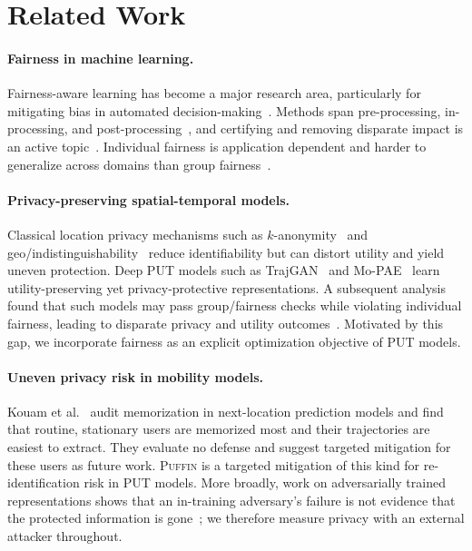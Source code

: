 \documentclass[sigconf,anonymous,review]{acmart}
\newcommand{\puffin}{\textsc{Puffin}}
\begin{document}
\section{Related Work}
\paragraph{Fairness in machine learning.} Fairness-aware learning has become a major research area, particularly for mitigating bias in automated decision-making~\cite{barocas2016disparate}. Methods span pre-processing, in-processing, and post-processing~\cite{hardt2016equality,mehrabi2021survey}, and certifying and removing disparate impact is an active topic~\cite{feldman2015disparate}. Individual fairness is application dependent and harder to generalize across domains than group fairness~\cite{dwork2012fairness,verma2018definitions}.

\paragraph{Privacy-preserving spatial-temporal models.} Classical location privacy mechanisms such as $k$-anonymity~\cite{sweeney2002kanonymity} and geo\-/in\-dis\-tin\-guish\-abil\-i\-ty~\cite{andres2013geo} reduce identifiability but can distort utility and yield uneven protection. Deep PUT models such as TrajGAN~\cite{rao2020trajgan} and Mo-PAE~\cite{zhan2023mopae} learn utility-preserving yet privacy-protective representations. A subsequent analysis found that such models may pass group\-/fairness checks while violating individual fairness, leading to disparate privacy and utility outcomes~\cite{zhan2023fairness}. Motivated by this gap, we incorporate fairness as an explicit optimization objective of PUT models.

\paragraph{Uneven privacy risk in mobility models.} Kouam et al.~\cite{kouam2026secrets} audit memorization in next-location prediction models and find that routine, stationary users are memorized most and their trajectories are easiest to extract. They evaluate no defense and suggest targeted mitigation for these users as future work. \puffin{} is a targeted mitigation of this kind for re-identification risk in PUT models. More broadly, work on adversarially trained representations shows that an in-training adversary's failure is not evidence that the protected information is gone~\cite{elazar2018adversarial}; we therefore measure privacy with an external attacker throughout.
\end{document}
